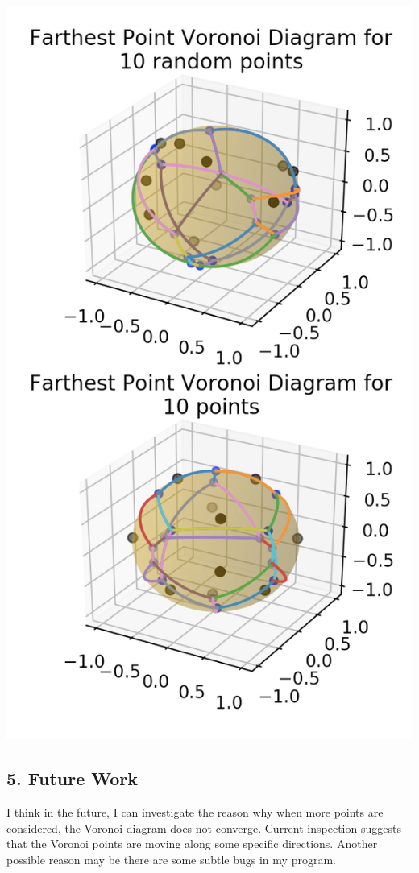 \documentclass{article}
\begin{document}
\includegraphics[scale=0.4]{f10}
\\
\subsection*{5. Future Work}
I think in the future, I can investigate the reason why when more points are considered, the Voronoi diagram does not converge. Current inspection suggests that the Voronoi points are moving along some specific directions. Another possible reason may be there are some subtle bugs in my program. 
\end{document}
